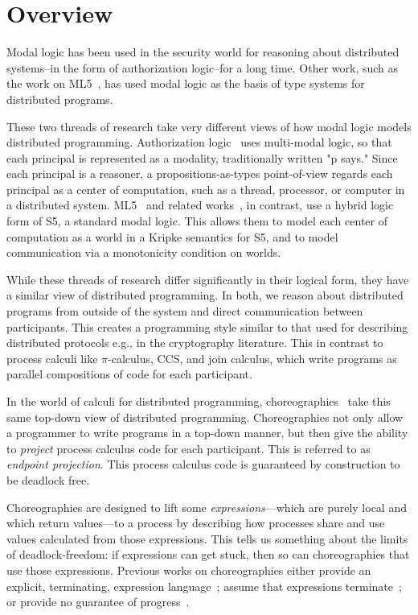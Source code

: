 \documentclass{article}
\theoremstyle{definition}
\begin{document}
\section{Overview}
\label{sec:overview}

Modal logic has been used in the security world for reasoning about distributed systems--in the form of authorization logic--for a long time.
Other work, such as the work on ML5~\citep{MurphyCH07}, has used modal logic as the basis of type systems for distributed programs.

These two threads of research take very different views of how modal logic models distributed programming.
Authorization logic~\citep{HirschACAT19-TR,HirschC13,GenoveseGR12,SchneiderWS11,GenoveseGGP11,GargP10,GargA08,Garg08,Abadi08,GargP06,Abadi03} uses multi-modal logic, so that each principal is represented as a modality, traditionally written "p says."
Since each principal is a reasoner, a propositions-as-types point-of-view regards each principal as a center of computation, such as a thread, processor, or computer in a distributed system.
ML5~\citep{MurphyCH07} and related works~\citep{JiaW04,AhmedJW03}, in contrast, use a hybrid logic form of S5, a standard modal logic.
This allows them to model each center of computation as a world in a Kripke semantics for S5, and to model communication via a monotonicity condition on worlds.

While these threads of research differ significantly in their logical form, they have a similar view of distributed programming.
In both, we reason about distributed programs from outside of the system and direct communication between participants.
This creates a programming style similar to that used for describing distributed protocols e.g., in the cryptography literature.
This in contrast to process calculi like $\pi$-calculus, CCS, and join calculus, which write programs as parallel compositions of code for each participant.

In the world of calculi for distributed programming, choreographies~\citep{Cruz-FilipeM17,Cruz-FilipeMP18,CarboneMS14,Montesi13,ZongyanXCH07,CarboneM13} take this same top-down view of distributed programming.
Choreographies not only allow a programmer to write programs in a top-down manner, but then give the ability to \emph{project} process calculus code for each participant.
This is referred to as \emph{endpoint projection}.
This process calculus code is guaranteed by construction to be deadlock free.

Choreographies are designed to lift some \emph{expressions}---which are purely local and which return values---to a process by describing how processes share and use values calculated from those expressions.
This tells us something about the limits of deadlock-freedom: if expressions can get stuck, then so can choreographies that use those expressions.
Previous works on choreographies either provide an explicit, terminating, expression language~\citep{Cruz-FilipeM17,CarboneMS14,ZongyanXCH07}; assume that expressions terminate~\citep{Cruz-FilipeMP18}; or provide no guarantee of progress~\citep{CarboneM13}.
\end{document}
